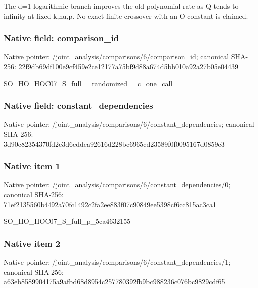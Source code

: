 \documentclass[10pt,a4paper]{article}
\begin{document}
\begingroup\raggedright\sloppy The d=\allowbreak{}1 logarithmic branch improves the old polynomial rate as Q tends to infinity at fixed k,\allowbreak{}nu,\allowbreak{}p. No exact finite crossover with an O-constant is claimed.\par\endgroup

\subsubsection{Native field: comparison\_\allowbreak{}id}
Native pointer: /joint\_\allowbreak{}analysis/comparisons/6/comparison\_\allowbreak{}id; canonical SHA-256: 22f9db69df100e9cf459e2ce12177a75bf9d88a674d5bb010a92a27b05e04439

\begingroup\raggedright\sloppy SO\_\allowbreak{}HO\_\allowbreak{}HOC07\_\allowbreak{}S\_\allowbreak{}full\_\allowbreak{}\_\allowbreak{}randomized\_\allowbreak{}\_\allowbreak{}c\_\allowbreak{}one\_\allowbreak{}call\par\endgroup

\subsubsection{Native field: constant\_\allowbreak{}dependencies}
Native pointer: /joint\_\allowbreak{}analysis/comparisons/6/constant\_\allowbreak{}dependencies; canonical SHA-256: 3d90c82354370fd2c3d6eddea92616d228bc6965cd23589f0f0095167d0859e3

\subsubsection{Native item 1}
Native pointer: /joint\_\allowbreak{}analysis/comparisons/6/constant\_\allowbreak{}dependencies/0; canonical SHA-256: 71ef2135560b4492a70fc1492c2fa2ee883f07c90849ee5398cf6cc815ac3ca1

\begingroup\raggedright\sloppy SO\_\allowbreak{}HO\_\allowbreak{}HOC07\_\allowbreak{}S\_\allowbreak{}full\_\allowbreak{}p\_\allowbreak{}5ca4632155\par\endgroup

\subsubsection{Native item 2}
Native pointer: /joint\_\allowbreak{}analysis/comparisons/6/constant\_\allowbreak{}dependencies/1; canonical SHA-256: a63eb8589904175a9afbd68d8954c257780392fb9bc988236c076bc9829cdf65
\end{document}
